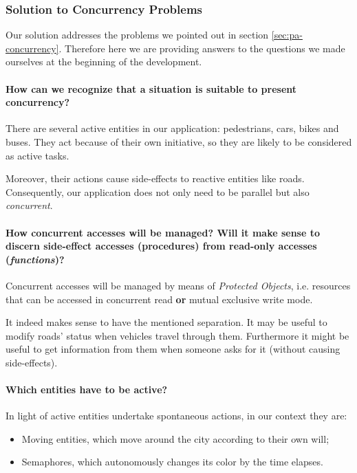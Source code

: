\subsubsection{Solution to Concurrency Problems}

Our solution addresses the problems we pointed out in section 
\ref{sec:pa-concurrency}.
Therefore here we are providing answers to the questions 
we made ourselves at the beginning of the development.

\paragraph{How can we recognize that a situation is suitable to present
concurrency?}
There are several active entities in our application: 
pedestrians, cars, bikes and buses. 
They act because of their own initiative, 
so they are likely to be considered as active tasks.

Moreover, their actions cause side-effects to reactive entities like roads.
Consequently, our application does not only need to be parallel 
but also \textit{concurrent}.

\paragraph{How concurrent accesses will be managed? Will it make sense to
discern side-effect accesses (procedures) from read-only accesses
(\textit{functions})?} 
Concurrent accesses will be managed by means of \textit{Protected Objects}, 
i.e. resources that can be accessed in concurrent read
\textbf{or} mutual exclusive write mode.

It indeed makes sense to have the mentioned separation. 
It may be useful to modify roads' status when vehicles travel through them. 
Furthermore it might be useful to get information from them 
when someone asks for it (without causing side-effects).

\paragraph{Which entities have to be active?} 
In light of active entities undertake spontaneous actions, in our context they are:
\begin{itemize}
  \item Moving entities, which move around the city according to their own will;
  \item Semaphores, which autonomously changes its color by the time elapses.
\end{itemize}

